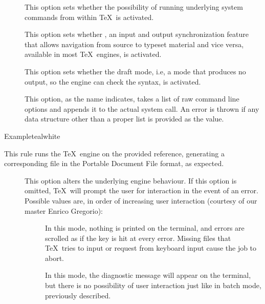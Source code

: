 \begin{description}
\begin{description}
\item[] This option sets whether the possibility of running underlying system commands from within \TeX\ is activated.

\item[] This option sets whether , an input and output synchronization feature that allows navigation from source to typeset material and vice versa, available in most \TeX\ engines, is activated.

\item[] This option sets whether the draft mode, i.e, a mode that produces no output, so the engine can check the syntax, is activated.

\item[] This option, as the name indicates, takes a list of raw command line options and appends it to the actual system call. An error is thrown if any data structure other than a proper list is provided as the value.
\end{description}

\begin{codebox}{Example}{teal}{\icnote}{white}
\end{codebox}

\item[\rulebox{luatex}{Marco Daniel, Paulo Cereda}] This rule runs the  \TeX\ engine on the provided  reference, generating a corresponding file in the Portable Document File format, as expected.

\begin{description}
\item[] This option alters the underlying engine behaviour. If this option is omitted, \TeX\ will prompt the user for interaction in the event of an error. Possible values are, in order of increasing user interaction (courtesy of our master Enrico Gregorio):

\begin{description}
\item[] In this mode, nothing is printed on the terminal, and errors are scrolled as if the  key is hit at every error. Missing files that \TeX\ tries to input or request from keyboard input cause the job to abort.

\item[] In this mode, the diagnostic message will appear on the terminal, but there is no possibility of user interaction just like in batch mode, previously described.


\end{description}
\end{description}
\end{description}
